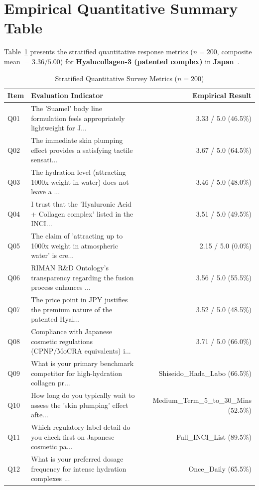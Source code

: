 \documentclass[10pt,twocolumn,a4paper]{article}
\begin{document}
\section{Empirical Quantitative Summary Table}
Table~\ref{tab:metrics} presents the stratified quantitative response metrics ($n = 200$, composite mean $= 3.36/5.00$) for \textbf{Hyalucollagen-3 (patented complex)} in \textbf{Japan}~\cite{ref_kaggle_doi,ref_hf_doi}.

\begin{table}[t]
\centering
\caption{Stratified Quantitative Survey Metrics ($n = 200$)}
\label{tab:metrics}
\small
\begin{tabularx}{\textwidth}{l X r}
\toprule
\textbf{Item} & \textbf{Evaluation Indicator} & \textbf{Empirical Result} \\
\midrule
Q01 & The 'Suamel' body line formulation feels appropriately lightweight for J... & 3.33 / 5.0 (46.5\%) \\
Q02 & The immediate skin plumping effect provides a satisfying tactile sensati... & 3.67 / 5.0 (64.5\%) \\
Q03 & The hydration level (attracting 1000x weight in water) does not leave a ... & 3.46 / 5.0 (48.0\%) \\
Q04 & I trust that the 'Hyaluronic Acid + Collagen complex' listed in the INCI... & 3.51 / 5.0 (49.5\%) \\
Q05 & The claim of 'attracting up to 1000x weight in atmospheric water' is cre... & 2.15 / 5.0 (0.0\%) \\
Q06 & RIMAN R\&D Ontology's transparency regarding the fusion process enhances ... & 3.56 / 5.0 (55.5\%) \\
Q07 & The price point in JPY justifies the premium nature of the patented Hyal... & 3.52 / 5.0 (48.5\%) \\
Q08 & Compliance with Japanese cosmetic regulations (CPNP/MoCRA equivalents) i... & 3.71 / 5.0 (66.0\%) \\
Q09 & What is your primary benchmark competitor for high-hydration collagen pr... & Shiseido\_Hada\_Labo (66.5\%) \\
Q10 & How long do you typically wait to assess the 'skin plumping' effect afte... & Medium\_Term\_5\_to\_30\_Mins (52.5\%) \\
Q11 & Which regulatory label detail do you check first on Japanese cosmetic pa... & Full\_INCI\_List (89.5\%) \\
Q12 & What is your preferred dosage frequency for intense hydration complexes ... & Once\_Daily (65.5\%) \\

\end{tabularx}
\end{table}
\end{document}
